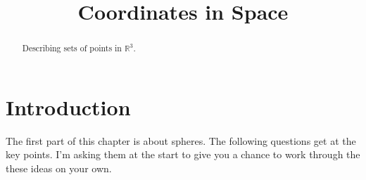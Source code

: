 \documentclass{ximera}
\title{Coordinates in Space}
\begin{document}
\begin{abstract}
Describing sets of points in $\mathbb{R}^3$.
\end{abstract}
\maketitle

 
 




\section*{Introduction}
The first part of this chapter is about spheres. The following questions get at the key points. I'm asking them at the start to give you a chance to work through the these ideas on your own.
\end{document}
